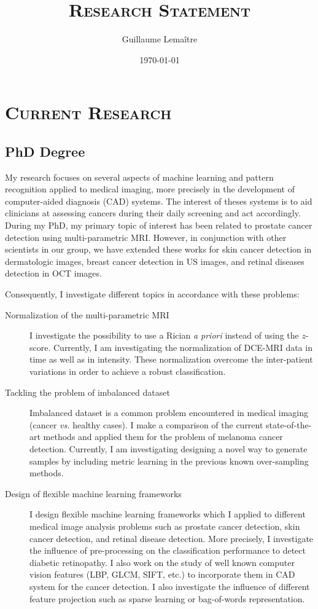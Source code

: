 \documentclass[a4paper]{article}
\title{\textbf{\textsc{Research Statement}}}
\author{Guillaume Lema\^itre}
\date{\today}
\begin{document}
\fontsize{12}{15}
\selectfont
\maketitle

\section{\textsc{Current Research}}

\subsection{PhD Degree}

My research focuses on several aspects of machine learning and pattern recognition applied to medical imaging, more precisely in the development of computer-aided diagnosis (CAD) systems.
The interest of theses systems is to aid clinicians at assessing cancers during their daily screening and act accordingly. 
During my PhD, my primary topic of interest has been related to prostate cancer detection using multi-parametric MRI.
However, in conjunction with other scientists in our group, we have extended these works for skin cancer detection in dermatologic images, breast cancer detection in US images, and retinal diseases detection in OCT images.

Consequently, I investigate different topics in accordance with these problems: 

\begin{description}
\item[Normalization of the multi-parametric MRI] I investigate the possibility to use a Rician \textit{a priori} instead of using the $z$-score. Currently, I am investigating the normalization of DCE-MRI data in time as well as in intensity. These normalization overcome the inter-patient variations in order to achieve a robust classification.
\item[Tackling the problem of imbalanced dataset] Imbalanced dataset is a common problem encountered in medical imaging (cancer \textit{vs.} healthy cases). I make a comparison of the current state-of-the-art methods and applied them for the problem of melanoma cancer detection. Currently, I am investigating designing a novel way to generate samples by including metric learning in the previous known over-sampling methods.
\item[Design of flexible machine learning frameworks] I design flexible machine learning frameworks which I applied to different medical image analysis problems such as prostate cancer detection, skin cancer detection, and retinal disease detection. More precisely, I investigate the influence of pre-processing on the classification performance to detect diabetic retinopathy. I also work on the study of well known computer vision features (LBP, GLCM, SIFT, etc.) to incorporate them in CAD system for the cancer detection. I also investigate the influence of different feature projection such as sparse learning or bag-of-words representation.
\end{description}
\end{document}

